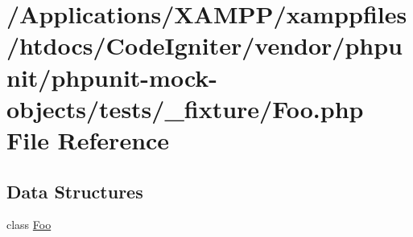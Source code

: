 \hypertarget{phpunit_2phpunit-mock-objects_2tests_2__fixture_2_foo_8php}{}\section{/\+Applications/\+X\+A\+M\+P\+P/xamppfiles/htdocs/\+Code\+Igniter/vendor/phpunit/phpunit-\/mock-\/objects/tests/\+\_\+fixture/\+Foo.php File Reference}
\label{phpunit_2phpunit-mock-objects_2tests_2__fixture_2_foo_8php}
\subsection*{Data Structures}
\begin{DoxyCompactItemize}
\item 
class \mbox{\hyperlink{class_foo}{Foo}}
\end{DoxyCompactItemize}
